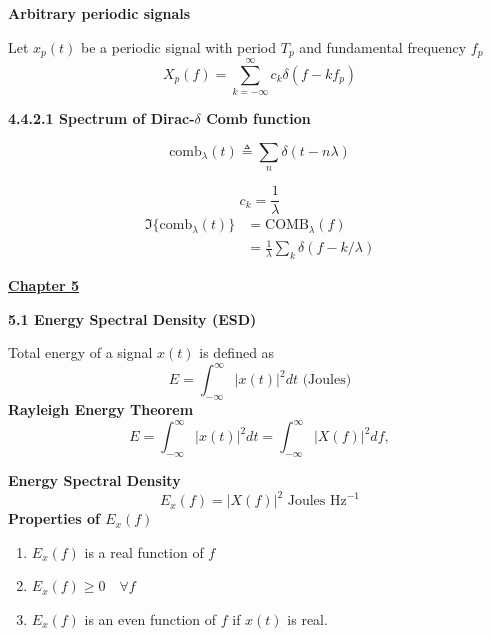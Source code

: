 \documentclass[landscape,a4paper]{extarticle}
\newenvironment{Figure}
  {\noindent\minipage{\linewidth}}
  {\endminipage\par\medskip}
\begin{document}
\begin{multicols*}{5}

    \textbf{Arbitrary periodic signals}

    Let $x_p(t)$ be a periodic signal with period $T_p$ and fundamental frequency $f_p$
    \[
        X_p(f)=\sum_{k=-\infty}^{\infty}c_k\delta (f-kf_p) \tag{4.16} 
    \]

    \textbf{4.4.2.1 Spectrum of Dirac-$\delta$ Comb function}

    \[
        \text{comb}_\lambda(t) \triangleq \sum_n\delta(t-n\lambda)
    \]


    \[
        c_k=\frac{1}{\lambda}
    \]
    \begin{align*}
        \Im\{\text{comb}_\lambda(t)\} &= \text{COMB}_\lambda(f)\\
        &=\frac{1}{\lambda}\sum_k\delta(f-k/\lambda)
    \end{align*}
    
    \textbf{\uline{Chapter 5}}

    \textbf{5.1 Energy Spectral Density (ESD)}

    Total energy of a signal $x(t)$ is defined as 
    \[
        E=\int_{-\infty}^{\infty}|x(t)|^2 dt \text{ (Joules)} \tag{5.1}
    \]
    \textbf{Rayleigh Energy Theorem}
    \[
        E=\int_{-\infty}^{\infty}|x(t)|^2dt=\int_{-\infty}^{\infty}|X(f)|^2df \tag{5.2},
    \]

    \textbf{Energy Spectral Density}
    \[
        E_x(f)=|X(f)|^2 \text{ Joules Hz}^{-1}\tag{5.3}
    \]
    \textbf{Properties of $E_x(f)$}
    \begin{enumerate}
        \item $E_x(f)$ is a real function of $f$
        \item $E_x(f) \geq 0 \quad\forall f$
        \item $E_x(f)$ is an even function of $f$ if $x(t)$ is real.
    \end{enumerate}


\end{multicols*}
\end{document}
